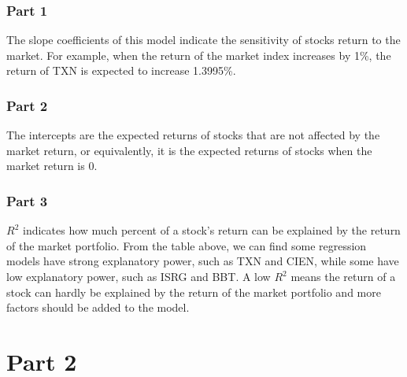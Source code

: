 \documentclass{report}
\begin{document}
\subsubsection{Part 1}
The slope coefficients of this model indicate the sensitivity of stocks return to the market. For example, when the return of the market index increases by 1\%, the return of TXN is expected to increase 1.3995\%.
\subsubsection{Part 2}
The intercepts are the expected returns of stocks that are not affected by the market return, or equivalently, it is the expected returns of stocks when the market return is 0. 
\subsubsection{Part 3}
$R^2$ indicates how much percent of a stock's return can be explained by the return of the market portfolio. From the table above, we can find some regression models have strong explanatory power, such as TXN and CIEN, while some have low explanatory power, such as ISRG and BBT. A low $R^2$ means the return of a stock can hardly be explained by the return of the market portfolio and more factors should be added to the model.

\newpage
\section{Part 2}
\end{document}
